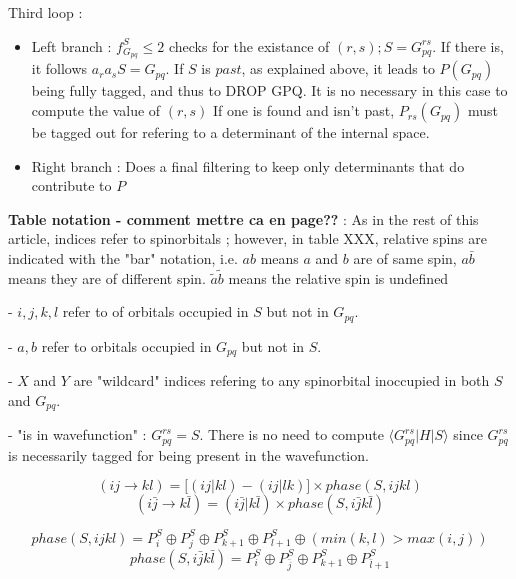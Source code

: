 Third loop :
\begin{itemize}

\item
Left branch : $f_{G_{pq}}^S \leq 2$ checks for the existance of $(r,s) ;S=G_{pq}^{rs}$. 
If there is, it follows $a_r a_s S = G_{pq}$. If $S$ is $past$, as explained above, it leads to $P(G_{pq})$ being fully tagged, and thus to DROP GPQ. It is no necessary in this case to compute the value of $(r,s)$
If one is found and isn't past, $P_{rs}(G_{pq})$ must be tagged out for refering to a determinant of the internal space.
\item
Right branch :
Does a final filtering to keep only determinants that do contribute to $P$
\end{itemize}



\textbf{Table notation - comment mettre ca en page??} : As in the rest of this article, indices refer to spinorbitals ; however, in table XXX, relative spins are indicated with the "bar" notation, i.e. $ab$ means $a$ and $b$ are of same spin, $a\bar b$ means they are of different spin. $\tilde a \tilde b$ means the relative spin is undefined

- $i,j,k,l$ refer to of orbitals occupied in $S$ but not in $G_{pq}$.

- $a,b$ refer to orbitals occupied in $G_{pq}$ but not in $S$.

- $X$ and $Y$ are "wildcard" indices refering to any spinorbital inoccupied in both $S$ and $G_{pq}$.

- "is in wavefunction" : $G_{pq}^{rs} = S$. There is no need to compute $\langle G_{pq}^{rs}|H|S \rangle$ since $G_{pq}^{rs}$ is necessarily tagged for being present in the wavefunction.


$$(ij \rightarrow kl) = \big [(ij|kl) - (ij|lk) \big ] \times phase(S,ijkl)$$
$$(i\bar j \rightarrow k\bar l) = (i\bar j|k\bar l) \times phase(S,i\bar jk\bar l)$$


$$phase(S,ijkl) = P^S_i \oplus P^S_j \oplus P^S_{k+1} \oplus P^S_{l+1} \oplus (min(k,l)>max(i,j))$$
$$phase(S,i\bar jk\bar l) = P^S_i \oplus P^S_{\bar j} \oplus P^S_{k+1} \oplus P^S_{\bar l+1}$$



